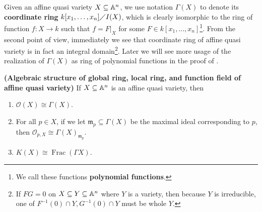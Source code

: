 \documentclass{report}
\begin{document}
Given an affine quasi variety $X\subseteq \mathbb{A}^n$, we use notation $\Gamma (X)$ to denote its \textbf{coordinate ring} $k[x_1,\dots ,x_n]\diagup I(X)$, which is clearly isomorphic to the ring of function $f:X\rightarrow k$ such that $f=F|_X$ for some $F \in k[x_1,\dots ,x_n]$\footnote{We call these functions \textbf{polynomial functions}.}. From the second point of view, immediately we see that coordinate ring of affine quasi variety is in fact an integral domain\footnote{If $FG=0$ on  $X \subseteq Y \subseteq \mathbb{A}^n$ where $Y$ is a variety, then because $Y$ is irreducible, one of $F^{-1}(0)\cap Y,G^{-1}(0)\cap Y$ must be whole $Y$.}. Later we will see more usage of the realization of  $\Gamma (X)$ as ring of polynomial functions in the proof of . 
\begin{theorem}
\label{Asog}
\textbf{(Algebraic structure of global ring, local ring, and function field of affine quasi variety)} If $X \subseteq \mathbb{A}^n$ is an affine quasi variety, then 
\begin{enumerate}[label=(\roman*)]
  \item $\mathscr{O}(X)\cong \Gamma (X)$. 
  \item For all $p \in X$, if we let $\mathfrak{m}_p\subseteq \Gamma (X)$ be the maximal ideal corresponding to $p$, then  $\mathscr{O}_{p,X}\cong \Gamma (X)_{\mathfrak{m}_p}$.
  \item $K(X)\cong  \operatorname{Frac}(\Gamma X)$.  
\end{enumerate}
\end{theorem}
\end{document}
